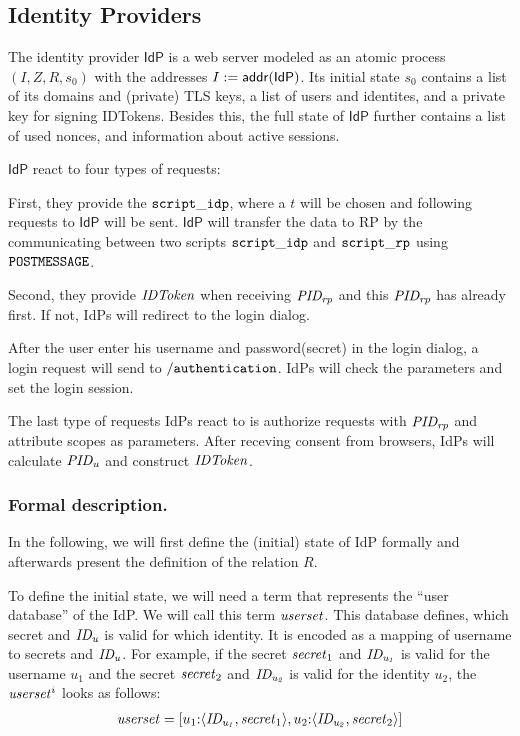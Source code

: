   \subsection{Identity Providers} \label{app:idps}
  
  The identity provider $\mathsf{IdP}$ is a web server 
  modeled as an atomic process $(I, Z, R, s_0)$ with 
  the addresses $I := \mathsf{addr}(\mathsf{IdP})$. 
  Its initial state $s_0$ contains a list of its 
  domains and (private) TLS keys, 
  a list of users and identites, and a private key 
  for signing IDTokens. Besides this, 
  the full state of $\mathsf{IdP}$ further contains a list 
  of used nonces, and information about active sessions.
  
  $\mathsf{IdP}$ react to four types of requests:
  
  First, they provide the $\mathtt{script\_idp}$, where a $t$ 
  will be chosen and following requests to $\mathsf{IdP}$ 
  will be sent. $\mathsf{IdP}$ will transfer the data
  to RP by the communicating between two scripts $\mathtt{script\_idp}$ 
  and $\mathtt{script\_rp}$ using $\mathtt{POSTMESSAGE}$.
  
  Second, they provide $\mathit{IDToken}$ when receiving $\mathit{PID_{rp}}$ and this 
  $\mathit{PID_{rp}}$ has already first. If not, IdPs will redirect to the login dialog.
  
  After the user enter his username and password(secret) in the login dialog, a login
  request will send to $\mathtt{/authentication}$. IdPs will check the parameters and 
  set the login session.
  
  The last type of requests IdPs react to is authorize requests with $\mathit{PID_{rp}}$ and attribute
  scopes as parameters. After receving consent from browsers, IdPs will calculate 
  $\mathit{PID_{u}}$ and construct $\mathit{IDToken}$.
  
  \subsubsection{Formal description.} In the following, we 
  will first define the (initial) state of IdP formally and 
  afterwards present the definition of the relation $R$.
  
  To define the initial state, we will need a term that 
  represents the ``user database'' of the IdP. We will 
  call this term $\mathit{userset}$. This database defines, 
  which secret and $\mathit{ID_u}$ is valid for which identity. 
  It is encoded as a mapping of username to secrets and $\mathit{ID_u}$. 
  For example, if the secret $\mathit{secret}_1$ and $\mathit{ID_{u_1}}$ is 
  valid for the username $u_1$ and the secret $\mathit{secret}_2$ 
  and $\mathit{ID_{u_2}}$ is valid for the identity $u_2$, the 
  $\mathit{userset}^i$ looks as follows:
  \begin{align*}
  \mathit{userset} = [u_1{:}\langle {{}\mathit{ID_{u_1}}, \mathit{secret}_1} \rangle, 
    u_2{:}\langle {{}\mathit{ID_{u_2}}, \mathit{secret}_2} \rangle]
  \end{align*}
  
